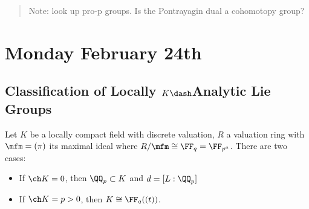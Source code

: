 \begin{quote}
Note: look up pro-p groups. Is the Pontrayagin dual a cohomotopy group?
\end{quote}

\hypertarget{monday-february-24th}{%
\section{Monday February 24th}\label{monday-february-24th}}

\hypertarget{classification-of-locally-kdashanalytic-lie-groups}{%
\subsection{\texorpdfstring{Classification of Locally \(K\dash\)Analytic
Lie
Groups}{Classification of Locally K\textbackslash dashAnalytic Lie Groups}}\label{classification-of-locally-kdashanalytic-lie-groups}}

Let \(K\) be a locally compact field with discrete valuation, \(R\) a
valuation ring with \(\mfm = (\pi)\) its maximal ideal where
\(R/\mfm \cong \FF_q = \FF_{p^a}\). There are two cases:

\begin{itemize}
\tightlist
\item
  If \(\ch K = 0\), then \(\QQ_p \subset K\) and \(d = [L: \QQ_p]\)
\item
  If \(\ch K = p > 0\), then \(K \cong \FF_q((t))\).
\end{itemize}

